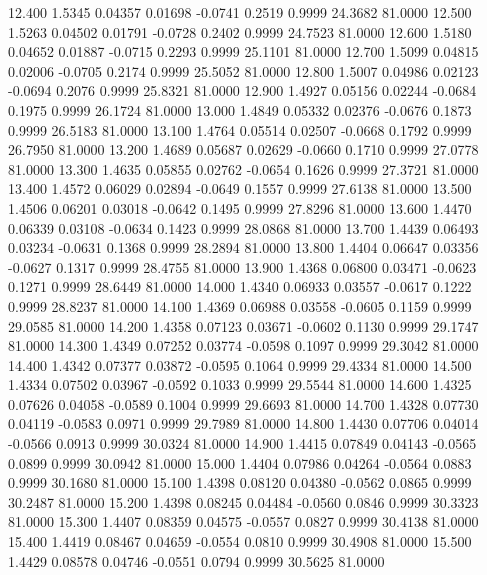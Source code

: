   12.400   1.5345   0.04357   0.01698  -0.0741   0.2519   0.9999  24.3682  81.0000
  12.500   1.5263   0.04502   0.01791  -0.0728   0.2402   0.9999  24.7523  81.0000
  12.600   1.5180   0.04652   0.01887  -0.0715   0.2293   0.9999  25.1101  81.0000
  12.700   1.5099   0.04815   0.02006  -0.0705   0.2174   0.9999  25.5052  81.0000
  12.800   1.5007   0.04986   0.02123  -0.0694   0.2076   0.9999  25.8321  81.0000
  12.900   1.4927   0.05156   0.02244  -0.0684   0.1975   0.9999  26.1724  81.0000
  13.000   1.4849   0.05332   0.02376  -0.0676   0.1873   0.9999  26.5183  81.0000
  13.100   1.4764   0.05514   0.02507  -0.0668   0.1792   0.9999  26.7950  81.0000
  13.200   1.4689   0.05687   0.02629  -0.0660   0.1710   0.9999  27.0778  81.0000
  13.300   1.4635   0.05855   0.02762  -0.0654   0.1626   0.9999  27.3721  81.0000
  13.400   1.4572   0.06029   0.02894  -0.0649   0.1557   0.9999  27.6138  81.0000
  13.500   1.4506   0.06201   0.03018  -0.0642   0.1495   0.9999  27.8296  81.0000
  13.600   1.4470   0.06339   0.03108  -0.0634   0.1423   0.9999  28.0868  81.0000
  13.700   1.4439   0.06493   0.03234  -0.0631   0.1368   0.9999  28.2894  81.0000
  13.800   1.4404   0.06647   0.03356  -0.0627   0.1317   0.9999  28.4755  81.0000
  13.900   1.4368   0.06800   0.03471  -0.0623   0.1271   0.9999  28.6449  81.0000
  14.000   1.4340   0.06933   0.03557  -0.0617   0.1222   0.9999  28.8237  81.0000
  14.100   1.4369   0.06988   0.03558  -0.0605   0.1159   0.9999  29.0585  81.0000
  14.200   1.4358   0.07123   0.03671  -0.0602   0.1130   0.9999  29.1747  81.0000
  14.300   1.4349   0.07252   0.03774  -0.0598   0.1097   0.9999  29.3042  81.0000
  14.400   1.4342   0.07377   0.03872  -0.0595   0.1064   0.9999  29.4334  81.0000
  14.500   1.4334   0.07502   0.03967  -0.0592   0.1033   0.9999  29.5544  81.0000
  14.600   1.4325   0.07626   0.04058  -0.0589   0.1004   0.9999  29.6693  81.0000
  14.700   1.4328   0.07730   0.04119  -0.0583   0.0971   0.9999  29.7989  81.0000
  14.800   1.4430   0.07706   0.04014  -0.0566   0.0913   0.9999  30.0324  81.0000
  14.900   1.4415   0.07849   0.04143  -0.0565   0.0899   0.9999  30.0942  81.0000
  15.000   1.4404   0.07986   0.04264  -0.0564   0.0883   0.9999  30.1680  81.0000
  15.100   1.4398   0.08120   0.04380  -0.0562   0.0865   0.9999  30.2487  81.0000
  15.200   1.4398   0.08245   0.04484  -0.0560   0.0846   0.9999  30.3323  81.0000
  15.300   1.4407   0.08359   0.04575  -0.0557   0.0827   0.9999  30.4138  81.0000
  15.400   1.4419   0.08467   0.04659  -0.0554   0.0810   0.9999  30.4908  81.0000
  15.500   1.4429   0.08578   0.04746  -0.0551   0.0794   0.9999  30.5625  81.0000
